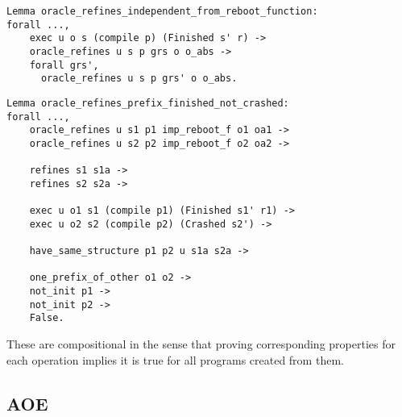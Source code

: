 \begin{verbatim}
Lemma oracle_refines_independent_from_reboot_function:
forall ...,
    exec u o s (compile p) (Finished s' r) ->
    oracle_refines u s p grs o o_abs ->
    forall grs', 
      oracle_refines u s p grs' o o_abs.
\end{verbatim}

\begin{verbatim}
Lemma oracle_refines_prefix_finished_not_crashed:
forall ...,
    oracle_refines u s1 p1 imp_reboot_f o1 oa1 ->
    oracle_refines u s2 p2 imp_reboot_f o2 oa2 ->
    
    refines s1 s1a ->
    refines s2 s2a ->
    
    exec u o1 s1 (compile p1) (Finished s1' r1) ->
    exec u o2 s2 (compile p2) (Crashed s2') ->
    
    have_same_structure p1 p2 u s1a s2a ->
    
    one_prefix_of_other o1 o2 ->
    not_init p1 ->
    not_init p2 ->
    False.
\end{verbatim}

These are compositional in the sense that proving corresponding properties for 
each operation implies it is true for all programs created from them. 

\subsection{AOE}
